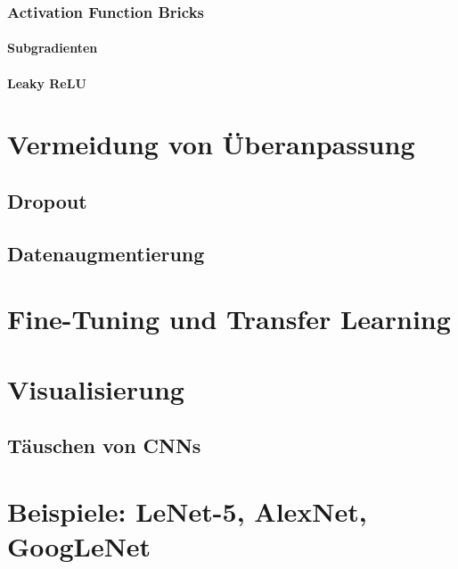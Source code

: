 			\subsubsection{Activation Function Bricks} %

				\paragraph{Subgradienten} %

				\paragraph{Leaky ReLU} %

	\section{Vermeidung von Überanpassung} %

		\subsection{Dropout} %

		\subsection{Datenaugmentierung} %

	\section{Fine-Tuning und Transfer Learning} %

	\section{Visualisierung} %

		\subsection{Täuschen von CNNs} %

	\section{Beispiele: LeNet-5, AlexNet, GoogLeNet} %

